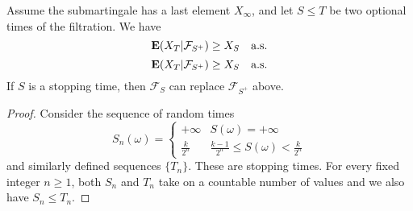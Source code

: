 \begin{theorem}
    Assume the submartingale has a last element $X_\infty$,
    and let $S\leq T$ be two optional times of the filtration. We have 
    \[ \mathbf{E}(X_T|\mathcal{F}_{S^+})\geq X_S \quad \text{a.s.}\] 
    \[ \mathbf{E}(X_T|\mathcal{F}_{S^+})\geq X_S \quad \text{a.s.}\] 
    If $S$ is a stopping time, then $\mathcal{F}_S$ can replace $\mathcal{F}_{S^+}$ above.
\end{theorem}
\begin{proof}
    Consider the sequence of random times 
    \[S_n(\omega)=\left\{\begin{matrix}
        +\infty   & S(\omega )=+\infty \\
        \frac{k}{2^n}   & \frac{k-1}{2^n} \leq S(\omega )<\frac{k}{2^n} 
        \end{matrix}\right. \]
    and similarly defined sequences $\{T_n\}$. These are stopping times.
    For every fixed integer $n\geq 1$, both $S_n$ and $T_n$ take on a countable number of values and we also have $S_n\leq T_n$.
\end{proof}


